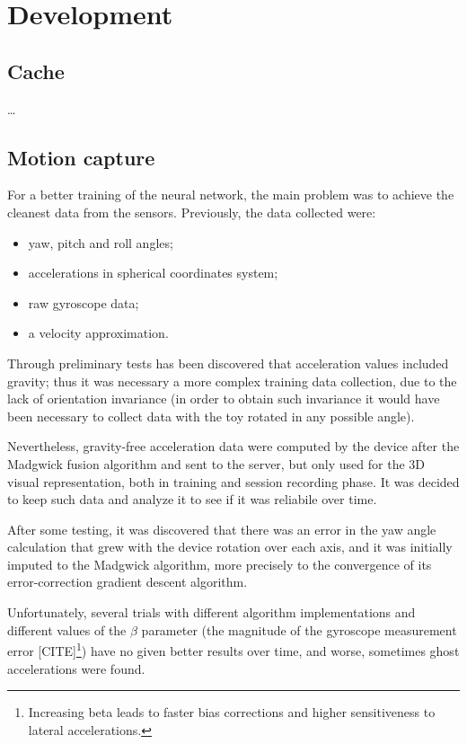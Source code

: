 \section{Development}

\subsection{Cache}
\dots

\subsection{Motion capture}
For a better training of the neural network, the main problem was to achieve the cleanest data from the sensors. Previously, the data collected were:
\begin{itemize}
	\item yaw, pitch and roll angles;
	\item accelerations in spherical coordinates system;
	\item raw gyroscope data;
	\item a velocity approximation.
\end{itemize}
\bigbreak

Through preliminary tests has been discovered that acceleration values included gravity; thus it was necessary a more complex training data collection, due to the lack of orientation invariance (in order to obtain such invariance it would have been necessary to collect data with the toy rotated in any possible angle).

Nevertheless, gravity-free acceleration data were computed by the device after the Madgwick fusion algorithm and sent to the server, but only used for the 3D visual representation, both in training and session recording phase. It was decided to keep such data and analyze it to see if it was reliabile over time.
\bigbreak

After some testing, it was discovered that there was an error in the yaw angle calculation that grew with the device rotation over each axis, and it was initially imputed to the Madgwick algorithm, more precisely to the convergence of its error-correction gradient descent algorithm.

Unfortunately, several trials with different algorithm implementations and different values of the $\beta$ parameter (the magnitude of the gyroscope measurement error [CITE]\footnote{Increasing beta leads to faster bias corrections and higher sensitiveness to lateral accelerations.}) have no given better results over time, and worse, sometimes ghost accelerations were found.

